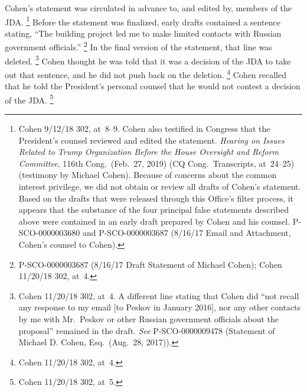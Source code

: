 Cohen's statement was circulated in advance to, and edited by, members of the JDA\null.%
\footnote{Cohen 9/12/18 302, at~8--9.
Cohen also testified in Congress that the President's counsel reviewed and edited the statement.
\textit{Hearing on Issues Related to Trump Organization Before the House Oversight and Reform Committee}, 116th Cong.\ (Feb.~27, 2019) (CQ Cong.\ Transcripts, at~24--25) (testimony by Michael Cohen).
Because of concerns about the common interest privilege, we did not obtain or review all drafts of Cohen's statement.
Based on the drafts that were released through this Office's filter process, it appears that the substance of the four principal false statements described above were contained in an early draft prepared by Cohen and his counsel.
P-SCO-0000003680 and P-SCO-0000003687 (8/16/17 Email and Attachment, Cohen's counsel to Cohen).}
Before the statement was finalized, early drafts contained a sentence stating, ``The building project led me to make limited contacts with Russian government officials.''%
\footnote{P-SCO-0000003687 (8/16/17 Draft Statement of Michael Cohen);
Cohen 11/20/18 302, at~4.}
In the final version of the statement, that line was deleted.%
\footnote{Cohen 11/20/18 302, at~4.
A different line stating that Cohen did ``not recall any response to my email [to Peskov in January 2016], nor any other contacts by me with Mr.~Peskov or other Russian government officials about the proposal'' remained in the draft.
\textit{See} P-SCO-0000009478 (Statement of Michael D. Cohen, Esq.\ (Aug.~28, 2017)).}
Cohen thought he was told that it was a decision of the JDA to take out that sentence, and he did not push back on the deletion.%
\footnote{Cohen 11/20/18 302, at~4.}
Cohen recalled that he told the President's personal counsel that he would not contest a decision of the JDA\null.%
\footnote{Cohen 11/20/18 302, at~5.}

